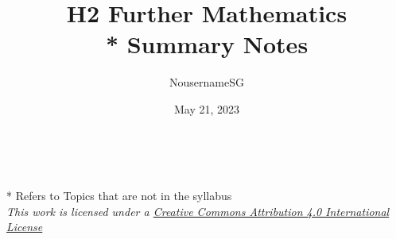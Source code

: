 
\title{H2 Further Mathematics \\* Summary Notes}
\author{NousernameSG}
\date{May 21, 2023}



\maketitle

\newpage \ \newpage

{\onecolumn \setcounter{tocdepth}{2} \tableofcontents}
\vfill \noindent
* Refers to Topics that are not in the syllabus \\
\textit{This work is licensed under a \href{http://creativecommons.org/licenses/by/4.0/}{Creative Commons Attribution 4.0 International License}}
\newpage
\twocolumn

 \newpage
 \newpage
 \newpage
 \newpage
 \newpage
 \newpage
 \newpage
 \newpage
 \newpage
 \newpage
 \newpage



